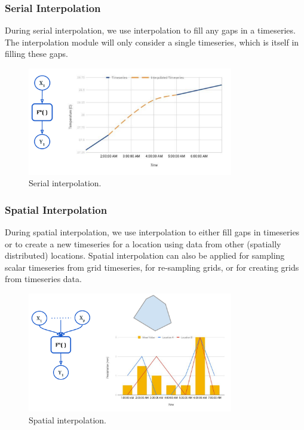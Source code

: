 \subsubsection{Serial Interpolation}
During serial interpolation, we use interpolation to fill any gaps in a timeseries. The interpolation module will only consider a single timeseries, which is itself in filling these gaps.

\begin{figure}[htp]
    \centering
    \includegraphics[width=0.8\textwidth]{method/data_preprocess/serial_interpolation.pdf}
    \caption{Serial interpolation.}
    \label{fi:serial_interpolation}
\end{figure}

\subsubsection{Spatial Interpolation}
During spatial interpolation, we use interpolation to either fill gaps in timeseries or to create a new timeseries for a location using data from other (spatially distributed) locations. Spatial interpolation can also be applied for sampling scalar timeseries from grid timeseries, for re-sampling grids, or for creating grids from timeseries data.
\begin{figure}[htp]
    \centering
    \includegraphics[width=0.8\textwidth]{method/data_preprocess/spatial_interpolation.pdf}
    \caption{Spatial interpolation.}
    \label{fi:spatial_interpolation}
\end{figure}

